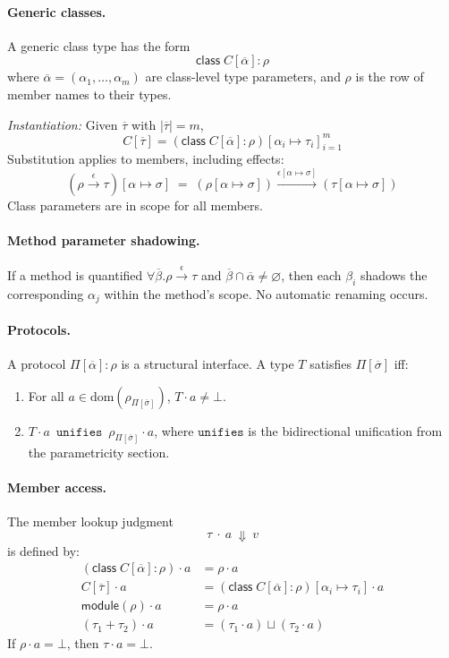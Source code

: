 \paragraph{Generic classes.}
A generic class type has the form
\[
\mathsf{class}\; C[\overline{\alpha}] : \rho
\]
where $\overline{\alpha} = (\alpha_1,\dots,\alpha_m)$ are class-level type parameters, and $\rho$ is the row of member names to their types.

\emph{Instantiation:} Given $\overline{\tau}$ with $|\overline{\tau}| = m$,
\[
C[\overline{\tau}] = (\mathsf{class}\;C[\overline{\alpha}] : \rho)[\alpha_i \mapsto \tau_i]_{i=1}^m
\]
Substitution applies to members, including effects:
\[
(\rho \xrightarrow{\epsilon} \tau)[\alpha \mapsto \sigma] \;=\; (\rho[\alpha \mapsto \sigma]) \xrightarrow{\epsilon[\alpha \mapsto \sigma]} (\tau[\alpha \mapsto \sigma])
\]
Class parameters are in scope for all members.

\paragraph{Method parameter shadowing.}
If a method is quantified $\forall\overline{\beta}.\rho \xrightarrow{\epsilon} \tau$ and $\overline{\beta} \cap \overline{\alpha} \neq \varnothing$, then each $\beta_i$ shadows the corresponding $\alpha_j$ within the method’s scope. No automatic renaming occurs.

\paragraph{Protocols.}
A protocol $\Pi[\overline{\alpha}]: \rho$ is a structural interface.
A type $T$ satisfies $\Pi[\overline{\sigma}]$ iff:
\begin{enumerate}
\item For all $a \in \mathrm{dom}(\rho_{\Pi[\overline{\sigma}]})$, $T \cdot a \neq \bot$.
\item $T \cdot a \ \mathrel{\texttt{unifies}} \ \rho_{\Pi[\overline{\sigma}]} \cdot a$,
  where $\texttt{unifies}$ is the bidirectional unification from the parametricity section.
\end{enumerate}

\paragraph{Member access.}
The member lookup judgment
\[
\tau \ \cdot\ a \ \Downarrow\ v
\]
is defined by:
\begin{align*}
(\mathsf{class}\;C[\overline{\alpha}] : \rho) \cdot a &= \rho \cdot a \\
C[\overline{\tau}] \cdot a &= (\mathsf{class}\;C[\overline{\alpha}]:\rho)[\alpha_i\mapsto\tau_i] \cdot a \\
\mathsf{module}(\rho) \cdot a &= \rho \cdot a \\
(\tau_1 + \tau_2) \cdot a &= (\tau_1 \cdot a) \sqcup (\tau_2 \cdot a)
\end{align*}
If $\rho \cdot a = \bot$, then $\tau \cdot a = \bot$.

